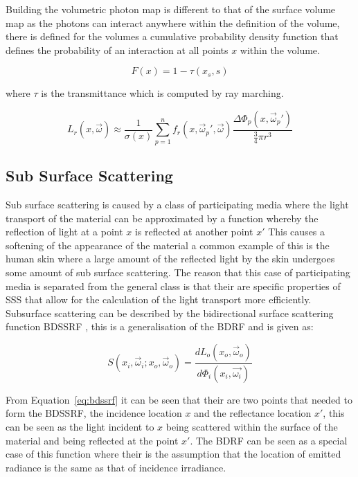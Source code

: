 Building the volumetric photon map is different to that of the surface volume map as the photons
can interact anywhere within the definition of the volume, there is defined for the volumes a
cumulative probability density function that defines the probability of an interaction at all
points $x$ within the volume.

\begin{equation}
F(x) = 1 - \tau(x_{s}, s)
\end{equation}

where $\tau$ is the transmittance which is computed by ray marching.

\begin{equation}
\label{eq:radiance_volumn_estimate}
L_{r}(x, \vec{\omega})
\approx
\frac
{1}
{\sigma(x)}
\sum_{p=1}^n
f_{r}(x,\vec{\omega}_{p}', \vec{\omega})
\frac
{
	\Delta\Phi_{p}(x, \vec{\omega}_{p}')
}
{
\frac{3}{4} \pi r^{3}
}
\end{equation}

\subsection{Sub Surface Scattering}
Sub surface scattering is caused by a class of participating media where the light transport of the
material can be approximated by a function whereby the reflection of light at a point $x$ is
reflected at another point $x'$ This causes a softening of the appearance of the material a common
example of this is the human skin where a large amount of the reflected light by the skin undergoes
some amount of sub surface scattering. The reason that this case of participating media is
separated from the general class is that their are specific properties of SSS that allow for
the calculation of the light transport more efficiently. Subsurface scattering can be described by
the bidirectional surface scattering function BDSSRF \cite{Jensen01}, this is a generalisation of 
the BDRF and is given as:

\begin{equation}
\label{eq:bdssrf}
	S(x_{i}, \vec{\omega}_{i};x_{o}, \vec{\omega}_{o}) =
		\frac
		{ dL_{o}(x_{o},\vec{\omega}_o)}
		{d\Phi_{i}(x_{i}, \vec{\omega_{i}})}
\end{equation}

From Equation~\ref{eq:bdssrf} it can be seen that their are two points that needed to form the
BDSSRF, the incidence location $x$ and the reflectance location $x'$, this can be seen as the
light incident to $x$ being scattered within the surface of the material and being reflected at
the point $x'$. The BDRF can be seen as a special case of this function where their is the
assumption that the location of emitted radiance is the same as that of incidence irradiance.
